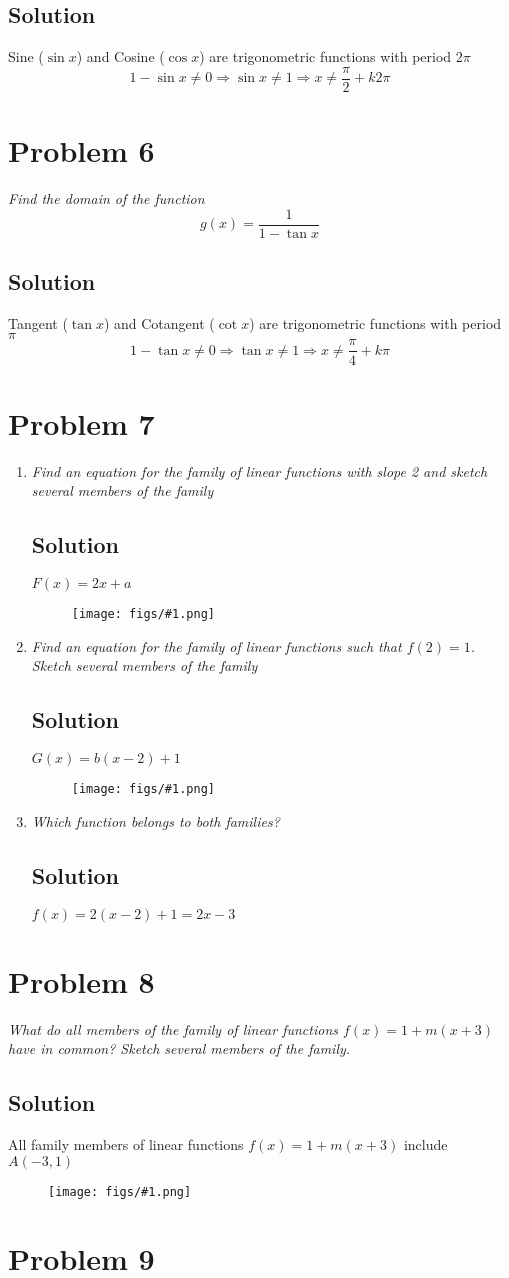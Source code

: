 \documentclass[11pt]{article}
\newcommand{\soln}{\subsection*}
\newcommand{\qn}{\textit}
\newcommand{\imgsoln}[1]{
	\begin{figure}[H]
		\centering
		\texttt{[image: figs/\#1.png]}
	\end{figure}
}
\begin{document}
\soln{Solution}
Sine ($\sin{x}$) and Cosine ($\cos{x}$) are trigonometric functions with period $2\pi$
\begin{equation*}
	1-\sin{x} \ne 0 \Rightarrow \sin{x} \ne 1 \Rightarrow x \ne \frac{\pi}{2} + k2\pi
\end{equation*}

\section*{Problem 6}

\qn{Find the domain of the function $$g(x)=\frac{1}{1-\tan{x}}$$}

\soln{Solution}
Tangent ($\tan{x}$) and Cotangent ($\cot{x}$) are trigonometric functions with period $\pi$
\begin{equation*}
	1-\tan{x} \ne 0 \Rightarrow \tan{x} \ne 1 \Rightarrow x \ne \frac{\pi}{4} + k\pi
\end{equation*}

\section*{Problem 7}

\begin{enumerate}
	\item \qn{Find an equation for the family of linear functions with slope 2 and sketch several members of the family}
	\soln{Solution}
	$F(x)=2x+a$
	\imgsoln{1.2.7-ans.a}
	
	\item \qn{Find an equation for the family of linear functions such that $f(2)=1$. Sketch several members of the family}
	\soln{Solution}
	$G(x)=b(x-2)+1$
	\imgsoln{1.2.7-ans.b}
	
	\item \qn{Which function belongs to both families?}
	\soln{Solution}
	$f(x)=2(x-2)+1=2x-3$
\end{enumerate}

\section*{Problem 8}

\qn{What do all members of the family of linear functions $f(x)=1+m(x+3)$ have in common? Sketch several members of the family.}

\soln{Solution}
All family members of linear functions $f(x)=1+m(x+3)$ include $A(-3, 1)$
\imgsoln{1.2.8-ans}

\section*{Problem 9}
\end{document}
